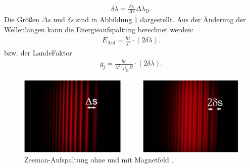 \begin{gather}
	\delta \lambda = \frac{\delta s}{\Delta s} \Delta\lambda_\text{D}. \label{eq:deltaLambda}
\end{gather}
Die Größen $\Delta s$ und $\delta s$ sind in Abbildung \ref{fig:Auswertung} dargestellt.
Aus der Änderung der Wellenlängen kann die Energieaufspaltung berechnet werden:
\begin{gather}
	E_\text{Auf}=\frac{h c}{\lambda^2} \cdot (2\delta \lambda). \label{eq:EaufExp}
\end{gather}
bzw. der LandeFaktor
\begin{gather}
	g_\text{j}=\frac{h c}{\lambda^2 \cdot \mu_\text{B} B} \cdot (2\delta \lambda). \label{eq:exgj}
\end{gather}
\begin{figure}
	\centering
	\includegraphics[width=\linewidth-50pt,height=\textheight-50pt,keepaspectratio]{content/Images/Auswertung.png}
    \caption{Zeeman-Aufspaltung ohne und mit Magnetfeld \cite{V27}.}
    \label{fig:Auswertung}
\end{figure}